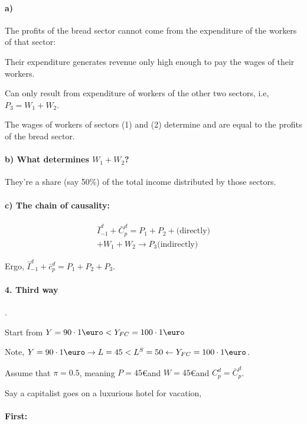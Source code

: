 \documentclass{report}
\begin{document}
\paragraph{a)} The profits of the bread sector cannot come from the expenditure of the workers of that sector: 

Their expenditure generates revenue only high enough to pay the wages of their workers. 

Can only result from expenditure of workers of the other two sectors, i.e, $P_3=W_1+W_2$.

The wages of workers of sectors (1) and (2) determine and are equal to the profits of the bread sector. 

\paragraph{b) What determines $W_1+W_2$?}

They're a share (say 50\%) of the total income distributed by those sectors. 

\paragraph{c) The chain of causality:}

\begin{equation*}
    \begin{aligned}
        \bar{I}^d_{-1}+\bar{C}_p^d=P_1+P_2+ \text{(directly)} \\
        +W_1+W_2 \rightarrow P_3 \text{(indirectly)}
    \end{aligned}
\end{equation*}

Ergo, $\bar{I}^d_{-1}+\bar{c}_p^d=P_1+P_2+P_3$.

\paragraph{4. Third way}. 

Start from $Y=90\cdot 1\text{\euro}<Y_{FC}=100\cdot 1\text{\euro}$

Note, $Y=90\cdot 1\text{\euro} \rightarrow L=45 < L^S=50 \leftarrow Y_{FC}=100 \cdot 1\text{\euro}$.

Assume that $\pi=0.5$, meaning $P=45$\euro and $W=45$\euro and $C^d_p=\bar{C}^d_p$.

Say a capitalist goes on a luxurious hotel for vacation, 
\paragraph{First:}
\end{document}
